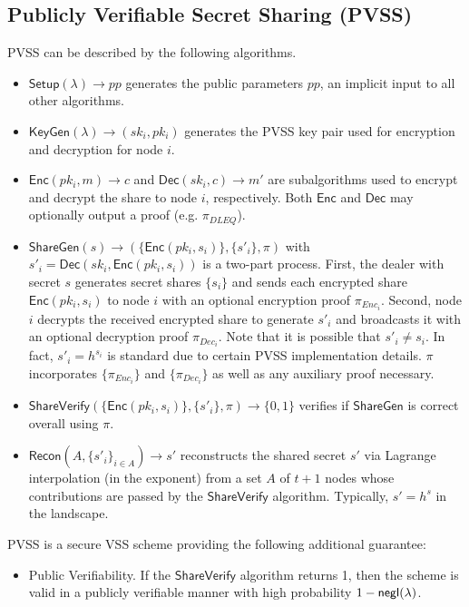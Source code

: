 \subsection{Publicly Verifiable Secret Sharing (PVSS)}
\label{appendix:pvss}
PVSS can be described by the following algorithms.
\begin{itemize}
    \item $\mathsf{Setup}(\lambda) \rightarrow pp$ generates the public parameters $pp$, an implicit input to all other algorithms.
    \item $\mathsf{KeyGen}(\lambda) \rightarrow (sk_i, pk_i)$ generates the PVSS key pair used for encryption and decryption for node $i$.
    \item $\mathsf{Enc}(pk_i, m) \rightarrow c$ and $\mathsf{Dec}(sk_i, c) \rightarrow m'$ are subalgorithms used to encrypt and decrypt the share to node $i$, respectively. Both $\mathsf{Enc}$ and $\mathsf{Dec}$ may optionally output a proof (e.g. $\pi_{DLEQ}$).
    \item $\mathsf{ShareGen}(s) \rightarrow (\{\mathsf{Enc}(pk_i, s_i)\}, \{s'_i\}, \pi)$ with $s'_i = \mathsf{Dec}(sk_i, \mathsf{Enc}(pk_i, s_i))$ is a two-part process. First, the dealer with secret $s$ generates secret shares $\{s_i\}$ and sends each encrypted share $\mathsf{Enc}(pk_i, s_i)$ to node $i$ with an optional encryption proof $\pi_{Enc_{i}}$. Second, node $i$ decrypts the received encrypted share to generate $s'_i$ and broadcasts it with an optional decryption proof $\pi_{Dec_{i}}$. Note that it is possible that $s'_i \neq s_i$. In fact, $s'_i = h^{s_i}$ is standard due to certain PVSS implementation details. $\pi$ incorporates $\{\pi_{Enc_{i}}\}$ and $\{\pi_{Dec_{i}}\}$ as well as any auxiliary proof necessary.
    \item $\mathsf{ShareVerify}(\{\mathsf{Enc}(pk_i, s_i)\}, \{s'_i\}, \pi) \rightarrow \{0, 1\}$ verifies if $\mathsf{ShareGen}$ is correct overall using $\pi$.
    \item $\mathsf{Recon}(A, \{s'_i\}_{i \in A}) \rightarrow s'$ reconstructs the shared secret $s'$ via Lagrange interpolation (in the exponent) from a set $A$ of $t + 1$ nodes whose contributions are passed by the $\mathsf{ShareVerify}$ algorithm. Typically, $s' = h^s$ in the landscape.
\end{itemize}

PVSS is a secure VSS scheme providing the following additional guarantee:
\begin{itemize}
    \item Public Verifiability. If the $\mathsf{ShareVerify}$ algorithm returns 1, then the scheme is valid in a publicly verifiable manner with high probability $1 - \mathsf{negl}(\lambda)$.\\
\end{itemize}

